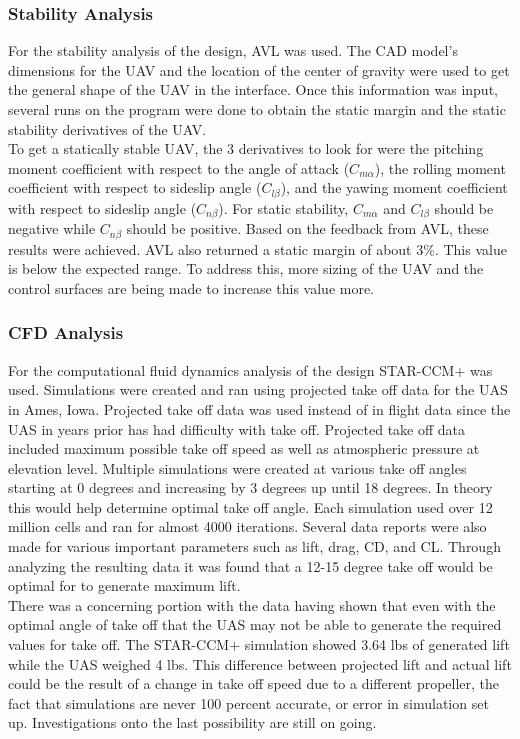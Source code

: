 \documentclass{article}
\begin{document}
\subsubsection{Stability Analysis}
For the stability analysis of the design, AVL was used. The CAD model's dimensions for the UAV and the location of the center of gravity were used to get the general shape of the UAV in the interface. Once this information was input, several runs on the program were done to obtain the static margin and the static stability derivatives of the UAV.\\
To get a statically stable UAV, the 3 derivatives to look for were the pitching moment coefficient with respect to the angle of attack ($C_{m\alpha}$), the rolling moment coefficient with respect to sideslip angle ($C_{l\beta}$), and the yawing moment coefficient with respect to sideslip angle ($C_{n\beta}$). For static stability, $C_{m\alpha}$ and $C_{l\beta}$ should be negative while $C_{n\beta}$ should be positive. Based on the feedback from AVL, these results were achieved. AVL also returned a static margin of about 3\%. This value is below the expected range. To address this, more sizing of the UAV and the control surfaces are being made to increase this value more.

\subsubsection{CFD Analysis}

For the computational fluid dynamics analysis of the design STAR-CCM+ was used. Simulations were created and ran using projected take off data for the UAS in Ames, Iowa. Projected take off data was used instead of in flight data since the UAS in years prior has had difficulty with take off. Projected take off data included maximum possible take off speed as well as atmospheric pressure at elevation level. Multiple simulations were created at various take off angles starting at 0 degrees and increasing by 3 degrees up until 18 degrees. In theory this would help determine optimal take off angle. Each simulation used over 12 million cells and ran for almost 4000 iterations. Several data reports were also made for various important parameters such as lift, drag, CD, and CL. Through analyzing the resulting data it was found that a 12-15 degree take off would be optimal for to generate maximum lift.\\ There was a concerning portion with the data having shown that even with the optimal angle of take off that the UAS may not be able to generate the required values for take off. The STAR-CCM+ simulation showed 3.64 lbs of generated lift while the UAS weighed 4 lbs. This difference between projected lift and actual lift could be the result of a change in take off speed due to a different propeller, the fact that simulations are never 100 percent accurate, or error in simulation set up. Investigations onto the last possibility are still on going.
\end{document}
